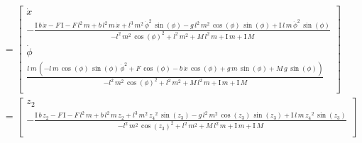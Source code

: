 \documentclass[12pt, letterpaper, onecolumn]{article}
\begin{document}
\begin{equation*}
    \begin{split}
        & =
        \begin{bmatrix}
            \dot{x}                                                                                                                                                                                                                                                                                                                                                      \\
            -\frac{\textrm{I}\,b\,\dot{x} -F\,\textrm{I}-F\,l^2 \,m+b\,l^2 \,m\,\dot{x} +l^3 \,m^2 \,{\dot{\phi} }^2 \,\sin \left(\phi \right)-g\,l^2 \,m^2 \,\cos \left(\phi \right)\,\sin \left(\phi \right)+\textrm{I}\,l\,m\,{\dot{\phi} }^2 \,\sin \left(\phi \right)}{-l^2 \,m^2 \,{\cos \left(\phi \right)}^2 +l^2 \,m^2 +M\,l^2 \,m+\textrm{I}\,m+\textrm{I}\,M} \\
            \dot{\phi}                                                                                                                                                                                                                                                                                                                                                   \\
            \frac{l\,m\,{\left(-l\,m\,\cos \left(\phi \right)\,\sin \left(\phi \right)\,{\dot{\phi} }^2 +F\,\cos \left(\phi \right)-b\,\dot{x} \,\cos \left(\phi \right)+g\,m\,\sin \left(\phi \right)+M\,g\,\sin \left(\phi \right)\right)}}{-l^2 \,m^2 \,{\cos \left(\phi \right)}^2 +l^2 \,m^2 +M\,l^2 \,m+\textrm{I}\,m+\textrm{I}\,M}                               \\
        \end{bmatrix} \\
        & =
        \begin{bmatrix}
            z_2                                                                                                                                                                                                                                                                                                                               \\
            -\frac{\textrm{I}\,b\,z_2 -F\,\textrm{I}-F\,l^2 \,m+b\,l^2 \,m\,z_2 +l^3 \,m^2 \,{z_4 }^2 \,\sin \left(z_3 \right)-g\,l^2 \,m^2 \,\cos \left(z_3 \right)\,\sin \left(z_3 \right)+\textrm{I}\,l\,m\,{z_4 }^2 \,\sin \left(z_3 \right)}{-l^2 \,m^2 \,{\cos \left(z_3 \right)}^2 +l^2 \,m^2 +M\,l^2 \,m+\textrm{I}\,m+\textrm{I}\,M} \\

\end{bmatrix}
\end{split}
\end{equation*}
\end{document}
